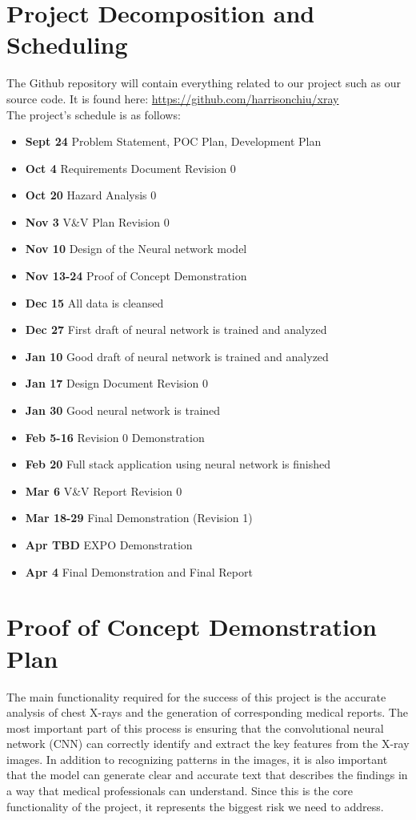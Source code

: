 \documentclass{article}
\begin{document}
\section{Project Decomposition and Scheduling}

The Github repository will contain everything related to our project such as our source code.
It is found here: \url{https://github.com/harrisonchiu/xray}\\

The project's schedule is as follows:
\begin{itemize}
  \item \textbf{Sept 24} Problem Statement, POC Plan, Development Plan
  \item \textbf{Oct 4} Requirements Document Revision 0
  \item \textbf{Oct 20} Hazard Analysis 0
  \item \textbf{Nov 3} V\&V Plan Revision 0
  \item \textbf{Nov 10} Design of the Neural network model
  \item \textbf{Nov 13-24} Proof of Concept Demonstration
  \item \textbf{Dec 15} All data is cleansed
  \item \textbf{Dec 27} First draft of neural network is trained and analyzed
  \item \textbf{Jan 10} Good draft of neural network is trained and analyzed
  \item \textbf{Jan 17} Design Document Revision 0
  \item \textbf{Jan 30} Good neural network is trained
  \item \textbf{Feb 5-16} Revision 0 Demonstration
  \item \textbf{Feb 20} Full stack application using neural network is finished
  \item \textbf{Mar 6} V\&V Report Revision 0
  \item \textbf{Mar 18-29} Final Demonstration (Revision 1)
  \item \textbf{Apr TBD} EXPO Demonstration
  \item \textbf{Apr 4} Final Demonstration and Final Report
\end{itemize}

\section{Proof of Concept Demonstration Plan}

The main functionality required for the success of this project is the accurate
analysis of chest X-rays and the generation of corresponding medical reports.
The most important part of this process is ensuring that the convolutional 
neural network (CNN) can correctly identify and extract the key features from
the X-ray images. In addition to recognizing patterns in the images, it is
also important that the model can generate clear and accurate text that 
describes the findings in a way that medical professionals can understand.
Since this is the core functionality of the project, it represents the biggest
risk we need to address.
\end{document}
